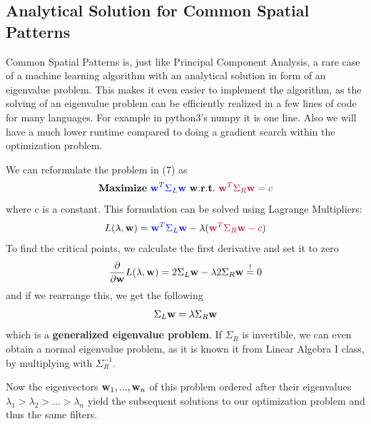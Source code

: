 \documentclass[12pt,twoside,twocolumn]{article}
\begin{document}
\subsection{Analytical Solution for Common Spatial Patterns}
Common Spatial Patterns is, just like Principal Component Analysis, a rare case of a machine learning algorithm with an analytical solution in form of an eigenvalue problem. This makes it even easier to implement the algorithm, as the solving of an eigenvalue problem can be efficiently realized in a few lines of code for many languages. For example in python3's numpy it is one line. Also we will have a much lower runtime compared to doing a gradient search within the optimization problem.

We can reformulate the problem in (7) as
\begin{equation}
{\bf Maximize} \ \textcolor{blue}{{\bf w}^T \Sigma_{L} {\bf w}} \ {\bf w.r.t.} \ \textcolor{purple}{ {\bf w}^T \Sigma_{R} {\bf w} = c}
\end{equation}
where c is a constant. This formulation can be solved using Lagrange Multipliers:
\begin{equation}
	L(\lambda, {\bf w}) =  \textcolor{blue}{{\bf w}^T \Sigma_{L} {\bf w}} - \lambda ( \textcolor{purple}{{\bf w}^T \Sigma_{R} {\bf w} - c})
\end{equation}
To find the critical points, we calculate the first derivative and set it to zero
\begin{equation}
	\frac{\partial}{\partial {\bf w}} L(\lambda, {\bf w}) = 2 \Sigma_{L} {\bf w} - \lambda 2 \Sigma_{R} {\bf w} \overset{!}{=}0
\end{equation}
and if we rearrange this, we get the following
\begin{equation}
	\Sigma_{L} {\bf w} = \lambda \Sigma_{R} {\bf w}
\end{equation}
which is a {\bf generalized eigenvalue problem}. If $\Sigma_R$ is invertible, we can even obtain a normal eigenvalue problem, as it is known it from Linear Algebra I class, by multiplying with $\Sigma_R^{-1}$. 

Now the eigenvectors ${\bf w}_1, ..., {\bf w}_n$ of this problem ordered after their eigenvalues $\lambda_1 > \lambda_2 >...> \lambda_n$ yield the subsequent solutions to our optimization problem and thus the same filters.
\end{document}
